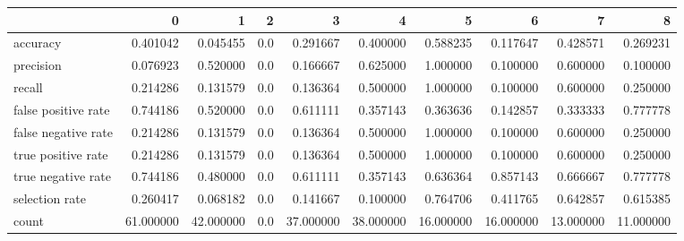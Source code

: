 \begin{tabular}{lrrrrrrrrr}
\toprule
{} &          0 &          1 &    2 &          3 &          4 &          5 &          6 &          7 &          8 \\
\midrule
accuracy            &   0.401042 &   0.045455 &  0.0 &   0.291667 &   0.400000 &   0.588235 &   0.117647 &   0.428571 &   0.269231 \\
precision           &   0.076923 &   0.520000 &  0.0 &   0.166667 &   0.625000 &   1.000000 &   0.100000 &   0.600000 &   0.100000 \\
recall              &   0.214286 &   0.131579 &  0.0 &   0.136364 &   0.500000 &   1.000000 &   0.100000 &   0.600000 &   0.250000 \\
false positive rate &   0.744186 &   0.520000 &  0.0 &   0.611111 &   0.357143 &   0.363636 &   0.142857 &   0.333333 &   0.777778 \\
false negative rate &   0.214286 &   0.131579 &  0.0 &   0.136364 &   0.500000 &   1.000000 &   0.100000 &   0.600000 &   0.250000 \\
true positive rate  &   0.214286 &   0.131579 &  0.0 &   0.136364 &   0.500000 &   1.000000 &   0.100000 &   0.600000 &   0.250000 \\
true negative rate  &   0.744186 &   0.480000 &  0.0 &   0.611111 &   0.357143 &   0.636364 &   0.857143 &   0.666667 &   0.777778 \\
selection rate      &   0.260417 &   0.068182 &  0.0 &   0.141667 &   0.100000 &   0.764706 &   0.411765 &   0.642857 &   0.615385 \\
count               &  61.000000 &  42.000000 &  0.0 &  37.000000 &  38.000000 &  16.000000 &  16.000000 &  13.000000 &  11.000000 \\
\bottomrule
\end{tabular}
